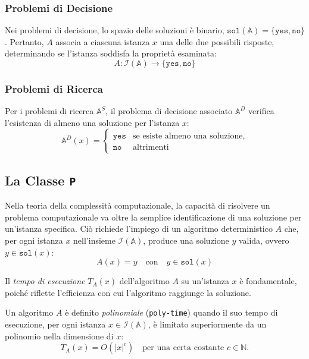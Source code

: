 \subsubsection{Problemi di Decisione}
Nei problemi di decisione, lo spazio delle soluzioni è binario, $\texttt{sol}(\mathbb{A})
= \{ \texttt{yes}, \texttt{no} \}$. Pertanto, $A$ associa a ciascuna istanza $x$ una delle
due possibili risposte, determinando se l'istanza soddisfa la proprietà esaminata:
\[
    A : \mathscr{I}(\mathbb{A}) \rightarrow \{ \texttt{yes}, \texttt{no} \}
\]

\subsubsection{Problemi di Ricerca}
Per i problemi di ricerca $\mathbb{A}^S$, il problema di decisione associato $\mathbb{A}^D$
verifica l'esistenza di almeno una soluzione per l'istanza $x$:
\[
    \mathbb{A}^D(x) = 
    \begin{cases}
        \texttt{yes} & \text{se esiste almeno una soluzione}, \\
        \texttt{no} & \text{altrimenti}
    \end{cases}
\]

\subsection{La Classe \texttt{P}}

Nella teoria della complessità computazionale, la capacità di risolvere un problema
computazionale va oltre la semplice identificazione di una soluzione per un'istanza
specifica. Ciò richiede l'impiego di un algoritmo deterministico $A$ che, per ogni istanza
$x$ nell'insieme $\mathscr{I}(\mathbb{A})$, produce una soluzione $y$ valida, ovvero $y
\in \texttt{sol}(x)$:
\[
  A(x) = y \quad \text{con} \quad y \in \texttt{sol}(x)
\]

Il \textit{tempo di esecuzione} $T_A(x)$ dell'algoritmo $A$ su un'istanza $x$ è fondamentale,
poiché riflette l'efficienza con cui l'algoritmo raggiunge la soluzione.

\begin{tcolorbox}[title={Classe \texttt{P}}]
Un algoritmo $A$ è definito \textit{polinomiale} (\texttt{poly-time}) quando il suo tempo di
esecuzione, per ogni istanza $x \in \mathscr{I}(\mathbb{A})$, è limitato superiormente da
un polinomio nella dimensione di $x$:
\[
    T_A(x) = O(|x|^c) \quad \text{per una certa costante } c \in \mathbb{N}.
\]
\end{tcolorbox}

